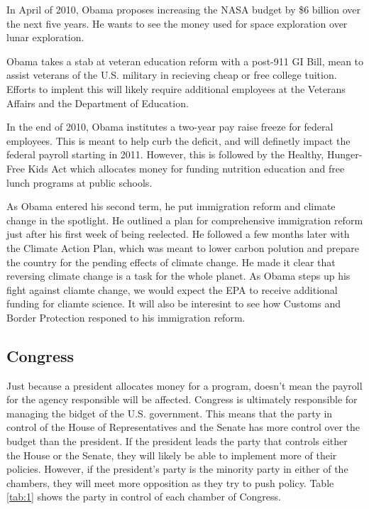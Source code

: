 \documentclass{article}
\begin{document}
        \par
        In April of 2010, Obama proposes increasing the NASA budget by \$6 billion over the next five years. He wants to see the money used for space exploration over lunar exploration.\cite{obamaevents}
        \par
        Obama takes a stab at veteran education reform with a post-911 GI Bill, mean to assist veterans of the U.S. military in recieving cheap or free college tuition.\cite{obamaevents} Efforts to implent this will likely require additional employees at the Veterans Affairs and the Department of Education.
        \par
        In the end of 2010, Obama institutes a two-year pay raise freeze for federal employees. This is meant to help curb the deficit, and will definetly impact the federal payroll starting in 2011. However, this is followed by the Healthy, Hunger-Free Kids Act which allocates money for funding nutrition education and free lunch programs at public schools.
        \par
        As Obama entered his second term, he put immigration reform and climate change in the spotlight. He outlined a plan for comprehensive immigration reform just after his first week of being reelected. He followed a few months later with the Climate Action Plan, which was meant to lower carbon polution and prepare the country for the pending effects of climate change. He made it clear that reversing climate change is a task for the whole planet.\cite{obamaevents} As Obama steps up his fight against cliamte change, we would expect the EPA to receive additional funding for cliamte science. It will also be interesint to see how Customs and Border Protection responed to his immigration reform.

    \subsection{Congress}
    Just because a president allocates money for a program, doesn't mean the payroll for the agency responsible will be affected. Congress is ultimately responsible for managing the bidget of the U.S. government. This means that the party in control of the House of Representatives and the Senate has more control over the budget than the president. If the president leads the party that controls either the House or the Senate, they will likely be able to implement more of their policies. However, if the president's party is the minority party in either of the chambers, they will meet more opposition as they try to push policy. Table \ref{tab:1} shows the party in control of each chamber of Congress.
\end{document}
